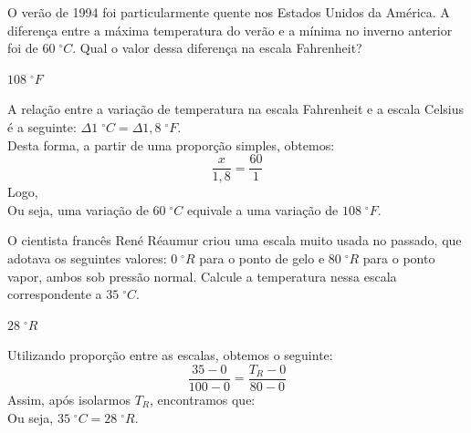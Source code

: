 \begin{exercise}[ID=Q201004, difficulty=easy, type=ER, typequestion=open]
    O verão de 1994 foi particularmente quente nos Estados Unidos da América. A diferença entre a máxima temperatura do verão e a mínima no inverno anterior foi de $60\;^\circ C$. Qual o valor dessa diferença na escala Fahrenheit?
\end{exercise}
\begin{shortsolution}
	$108\;^\circ F$
\end{shortsolution}
\begin{solution}
	A relação entre a variação de temperatura na escala Fahrenheit e a escala Celsius é a seguinte: $\Delta 1\;^\circ C=\Delta 1,8\;^\circ F$.\\ Desta forma, a partir de uma proporção simples, obtemos: \[\dfrac{x}{1,8}=\dfrac{60}{1}\] Logo, \\ Ou seja, uma variação de $60\;^\circ C$ equivale a uma variação de $108\;^\circ F$.   
\end{solution}

\begin{exercise}[ID=Q201005, difficulty=easy, type=ER, typequestion=open]
    O cientista francês René Réaumur criou uma escala muito usada no passado, que adotava os seguintes valores: $0\;^\circ R$ para o ponto de gelo e $80\;^\circ R$ para o ponto vapor, ambos sob pressão normal. Calcule a temperatura nessa escala correspondente a $35\;^\circ C$.
\end{exercise}
\begin{shortsolution}
	$28\;^\circ R$
\end{shortsolution}
\begin{solution}
	Utilizando proporção entre as escalas, obtemos o seguinte: 
	\[\dfrac{35-0}{100-0}=\dfrac{T_{R}-0}{80-0}\]
	Assim, após isolarmos $T_{R}$, encontramos que: \\ Ou seja, $35\;^\circ C=28\;^\circ R$.    
\end{solution}

